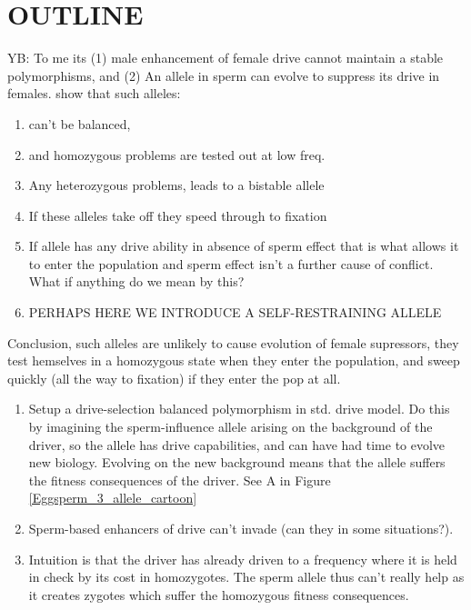 \documentclass[12pt,letterpaper]{article}
\newcommand{\yb}[1]{{ \color{blue} #1}}
\begin{document}
\section*{OUTLINE}
\yb{YB: To me its (1) male enhancement of female drive cannot maintain a stable polymorphisms, and (2) An allele in sperm can evolve to suppress its drive in females.}
show that such alleles:
\begin{enumerate}
\item can't be balanced, \\
\item and homozygous problems are tested out at low freq.  \\
\item Any heterozygous problems, leads to a bistable allele\\
\item If these alleles take off they speed through to fixation\\
\item If allele has any drive ability in absence of sperm effect that is what allows it to enter the population
and sperm effect isn't a further cause of conflict. What if anything do we mean by this?\\
\item PERHAPS HERE WE INTRODUCE A SELF-RESTRAINING ALLELE
\end{enumerate}

Conclusion, such alleles are unlikely to cause evolution of female supressors, they test hemselves in a homozygous
state when they enter the population, and sweep quickly (all the way to fixation) if they enter the pop at all.\\


\begin{enumerate}
\item Setup a drive-selection balanced polymorphism in std. drive model. 
Do this by imagining the sperm-influence allele arising on the background of the driver, 
so the allele has drive capabilities, and can have had time to evolve new biology. 
Evolving on the new background means that the allele suffers the fitness consequences of the 
driver.  See A in Figure \ref{Eggsperm_3_allele_cartoon} \\
\item Sperm-based enhancers of drive can't invade (can they in some situations?). \\
\item Intuition is that the driver has already driven to a frequency 
where it is held in check by its cost in homozygotes. The sperm allele 
thus can't really help as it creates zygotes which suffer the homozygous fitness consequences.
\end{enumerate}
\end{document}
